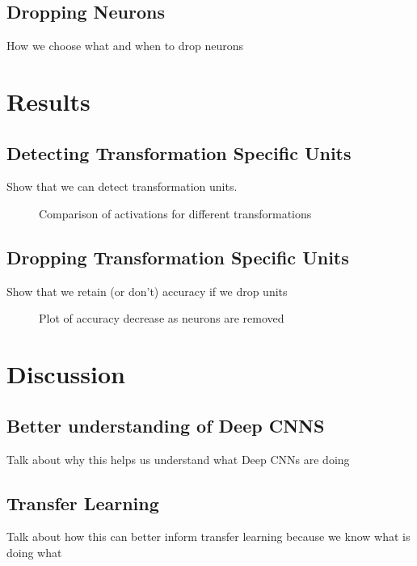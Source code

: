 \documentclass[10pt,twocolumn,letterpaper]{article}
\begin{document}
\subsection{Dropping Neurons}
How we choose what and when to drop neurons

\section{Results}

\subsection{Detecting Transformation Specific Units}
Show that we can detect transformation units.

\begin{figure}
\caption{Comparison of activations for different transformations}
\label{fig:comp}
\end{figure}

\subsection{Dropping Transformation Specific Units}
Show that we retain (or don't) accuracy if we drop units

\begin{figure}
\caption{Plot of accuracy decrease as neurons are removed}
\label{fig:comp}
\end{figure}

\section{Discussion}

\subsection{Better understanding of Deep CNNS}
Talk about why this helps us understand what Deep CNNs are doing

\subsection{Transfer Learning}

Talk about how this can better inform transfer learning because we know what is doing what
\end{document}

